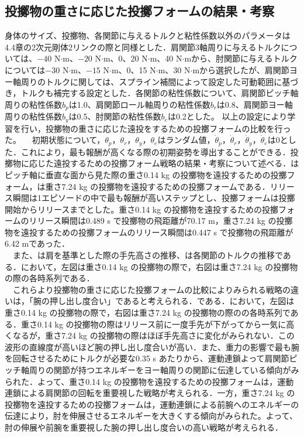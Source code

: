 \begin{small}
\subsection{投擲物の重さに応じた投擲フォームの結果・考察}
身体のサイズ、投擲物、各関節に与えるトルクと粘性係数以外のパラメータは4.4章の2次元剛体2リンクの際と同様とした．肩関節3軸周りに与えるトルクについては、$-40$ N$\cdot$m、$-20$ N$\cdot$m、0、20 N$\cdot$m、40 N$\cdot$mから、肘関節に与えるトルクについては$-30$ N$\cdot$m、$-15$ N$\cdot$m、0、15 N$\cdot$m、30 N$\cdot$mから選択したが、肩関節ヨー軸周りのトルクに関しては、スプライン補間によって設定した可動範囲に基づき，トルクも補完する設定とした．各関節の粘性係数について、肩関節ピッチ軸周りの粘性係数$b_{p}$は1.0、肩関節ロール軸周りの粘性係数$b_{r}$は0.8、肩関節ヨー軸周りの粘性係数$b_{y}$は0.5、肘関節の粘性係数$b_{e}$は0.2とした。
以上の設定により学習を行い，投擲物の重さに応じた遠投をするための投擲フォームの比較を行った。
　初期状態について，$\theta_{p}$，$\theta_{r}$，$\theta_{y}$，$\theta_{e}$はランダム値，$\dot{\theta}_{p}$，$\dot{\theta}_{r}$，$\dot{\theta}_{y}$，$\dot{\theta}_{e}$は0とした．これにより，最も報酬が高くなる際の初期姿勢を導出することができる．投擲物に応じた遠投するための投擲フォーム戦略の結果・考察について述べる．はピッチ軸に垂直な面から見た際の重さ0.14 kg の投擲物を遠投するための投擲フォーム，は重さ7.24 kg の投擲物を遠投するための投擲フォームである．リリース瞬間は1エピソードの中で最も報酬が高いステップとし、投擲フォームは投擲開始からリリースまでとした。重さ0.14 kg の投擲物を遠投するための投擲フォームのリリース瞬間は0.489 s で投擲物の飛距離が70.17 m，重さ7.24 kg の投擲物を遠投するための投擲フォームのリリース瞬間は0.447 s で投擲物の飛距離が6.42 mであった．\\
　また、は肩を基準とした際の手先高さの推移、は各関節のトルクの推移である．において，左図は重さ0.14 kg の投擲物の際で，右図は重さ7.24 kg の投擲物の際の各時系列である．\\
　これらより投擲物の重さに応じた投擲フォームの比較によりみられる戦略の違いは，「腕の押し出し度合い」であると考えられる．である．において，左図は重さ0.14 kg の投擲物の際で，右図は重さ7.24 kg の投擲物の際のの各時系列である．重さ0.14 kg の投擲物の際はリリース前に一度手先が下がってから一気に高くなるが，重さ7.24 kg の投擲物の際はほぼ手先高さに変化がみられない．この波形の直線度が高いほど腕の押し出し度合いが高い．また、重力の影響で最も腕を回転させるためにトルクが必要な0.35 s あたりから、運動連鎖よって肩関節ピッチ軸周りの関節が持つエネルギーをヨー軸周りの関節に伝達している傾向がみられた．よって、重さ0.14 kg の投擲物を遠投するための投擲フォームは，運動連鎖による肩関節の回転を重要視した戦略が考えられる．一方，重さ7.24 kg の投擲物を遠投するための投擲フォームは，運動連鎖による前腕へのエネルギーの伝達により，肘を伸展させるエネルギーを大きくする傾向がみられた。よって、肘の伸展や前腕を重要視した腕の押し出し度合いの高い戦略が考えられる．

\end{small}
